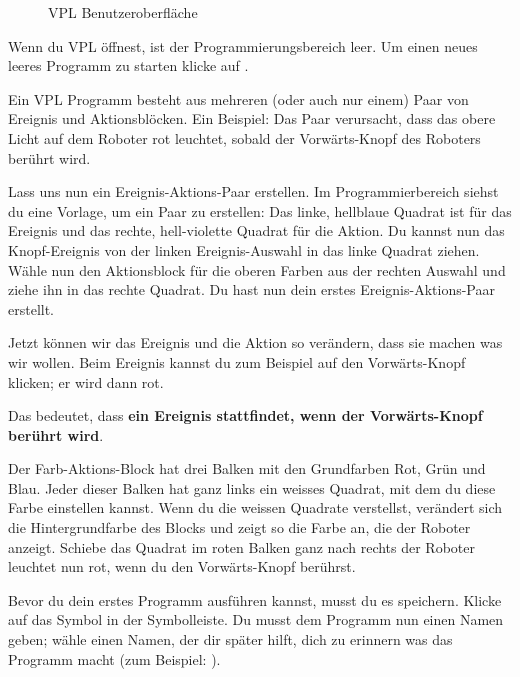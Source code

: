 \begin{figure}[hbt]
\caption{VPL Benutzeroberfläche}\label{fig.gui}
\end{figure}



Wenn du VPL öffnest, ist der Programmierungsbereich leer. Um einen neues leeres
Programm zu starten klicke auf .

Ein VPL Programm besteht aus mehreren (oder auch nur einem) Paar von Ereignis
und Aktionsblöcken. Ein Beispiel: Das Paar  verursacht, dass das
obere Licht auf dem Roboter rot leuchtet, sobald der Vorwärts-Knopf des
Roboters berührt wird.


Lass uns nun ein Ereignis-Aktions-Paar erstellen. Im Programmierbereich siehst
du eine Vorlage, um ein Paar zu erstellen:  Das
linke, hellblaue Quadrat ist für das Ereignis und das rechte, hell-violette
Quadrat für die Aktion. Du kannst nun das Knopf-Ereignis 
von der linken Ereignis-Auswahl in das linke Quadrat ziehen. Wähle nun den
Aktionsblock für die oberen Farben  aus der rechten
Auswahl und ziehe ihn in das rechte Quadrat. Du hast nun dein erstes
Ereignis-Aktions-Paar erstellt.

Jetzt können wir das Ereignis und die Aktion so verändern, dass sie machen was
wir wollen. Beim Ereignis kannst du zum Beispiel auf den Vorwärts-Knopf
klicken; er wird dann rot.

Das bedeutet, dass \textbf{ein Ereignis stattfindet, wenn der Vorwärts-Knopf
berührt wird}.

Der Farb-Aktions-Block hat drei Balken mit den Grundfarben Rot, Grün und Blau.
Jeder dieser Balken hat ganz links ein weisses Quadrat, mit dem du diese Farbe
einstellen kannst. Wenn du die weissen Quadrate verstellst, verändert sich die
Hintergrundfarbe des Blocks und zeigt so die Farbe an, die der Roboter anzeigt.
Schiebe das Quadrat im roten Balken ganz nach rechts  der Roboter
leuchtet nun rot, wenn du den Vorwärts-Knopf berührst. 


Bevor du dein erstes Programm ausführen kannst, musst du es speichern. Klicke
auf das Symbol  in der Symbolleiste. Du musst dem Programm nun
einen Namen geben; wähle einen Namen, der dir später hilft, dich zu erinnern
was das Programm macht (zum Beispiel: ).

